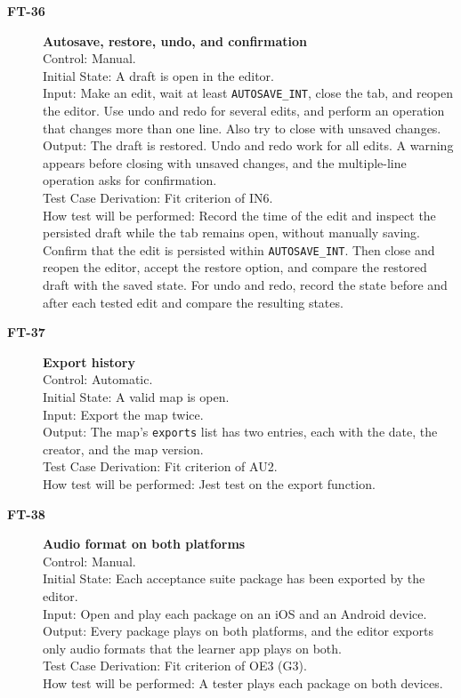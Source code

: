 \documentclass[12pt, titlepage]{article}
\newcommand{\tid}[1]{\hypertarget{test:#1}{\textbf{#1}}}
\newcommand{\cn}[1]{\texttt{#1}}
\begin{document}
\begin{description}
\item[\tid{FT-36}] \textbf{Autosave, restore, undo, and confirmation}\\
Control: Manual.\\
Initial State: A draft is open in the editor.\\
Input: Make an edit, wait at least \cn{AUTOSAVE\_INT}, close the tab, and reopen
the editor. Use undo and redo for several edits, and perform an operation that
changes more than one line. Also try to close with unsaved changes.\\
Output: The draft is restored. Undo and redo work for all edits. A warning
appears before closing with unsaved changes, and the multiple-line operation asks
for confirmation.\\
Test Case Derivation: Fit criterion of IN6.\\
How test will be performed: Record the time of the edit and inspect the
persisted draft while the tab remains open, without manually saving.
Confirm that the edit is persisted within \cn{AUTOSAVE\_INT}.
Then close and reopen the editor, accept the restore option, and compare
the restored draft with the saved state. For undo and redo, record the
state before and after each tested edit and compare the resulting states.

\item[\tid{FT-37}] \textbf{Export history}\\
Control: Automatic.\\
Initial State: A valid map is open.\\
Input: Export the map twice.\\
Output: The map's \texttt{exports} list has two entries, each with the date, the
creator, and the map version.\\
Test Case Derivation: Fit criterion of AU2.\\
How test will be performed: Jest test on the export function.

\item[\tid{FT-38}] \textbf{Audio format on both platforms}\\
Control: Manual.\\
Initial State: Each acceptance suite package has been exported by the editor.\\
Input: Open and play each package on an iOS and an Android device.\\
Output: Every package plays on both platforms, and the editor exports only audio
formats that the learner app plays on both.\\
Test Case Derivation: Fit criterion of OE3 (G3).\\
How test will be performed: A tester plays each package on both devices.

\end{description}
\end{document}
